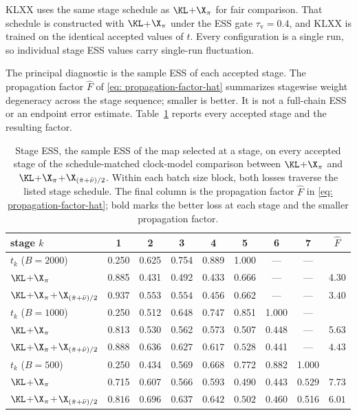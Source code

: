 \documentclass{article}
\begin{document}
KLXX uses the same stage schedule as $\KL$+$\X_\pi$ for fair comparison. That schedule is constructed with $\KL$+$\X_\pi$ under the ESS gate $\tau_{\mathrm v}=0.4$, and KLXX is trained on the identical accepted values of $t$. Every configuration is a single run, so individual stage ESS values carry single-run fluctuation.

The principal diagnostic is the sample ESS of each accepted stage. The propagation factor $\hat F$ of \eqref{eq: propagation-factor-hat} summarizes stagewise weight degeneracy across the stage sequence; smaller is better. It is not a full-chain ESS or an endpoint error estimate. Table~\ref{tab: clock-summary} reports every accepted stage and the resulting factor.

\begin{table}[htb]
    \centering
    \begin{tabular}{lcccccccc}
        \toprule
        stage $k$ & 1 & 2 & 3 & 4 & 5 & 6 & 7 & $\hat F$ \\
        \midrule
        $t_k$ ($B=2000$) & 0.250 & 0.625 & 0.754 & 0.889 & 1.000 & --- & --- & \\
        $\KL$+$\X_\pi$ & 0.885 & 0.431 & 0.492 & 0.433 & $\mathbf{0.666}$ & --- & --- & 4.30 \\
        $\KL$+$\X_\pi$+$\X_{(\hat\pi+\bar\nu)/2}$ & $\mathbf{0.937}$ & $\mathbf{0.553}$ & $\mathbf{0.554}$ & $\mathbf{0.456}$ & 0.662 & --- & --- & $\mathbf{3.40}$ \\
        \midrule
        $t_k$ ($B=1000$) & 0.250 & 0.512 & 0.648 & 0.747 & 0.851 & 1.000 & --- & \\
        $\KL$+$\X_\pi$ & 0.813 & 0.530 & 0.562 & 0.573 & 0.507 & $\mathbf{0.448}$ & --- & 5.63 \\
        $\KL$+$\X_\pi$+$\X_{(\hat\pi+\bar\nu)/2}$ & $\mathbf{0.888}$ & $\mathbf{0.636}$ & $\mathbf{0.627}$ & $\mathbf{0.617}$ & $\mathbf{0.528}$ & 0.441 & --- & $\mathbf{4.43}$ \\
        \midrule
        $t_k$ ($B=500$) & 0.250 & 0.434 & 0.569 & 0.668 & 0.772 & 0.882 & 1.000 & \\
        $\KL$+$\X_\pi$ & 0.715 & 0.607 & 0.566 & 0.593 & 0.490 & 0.443 & $\mathbf{0.529}$ & 7.73 \\
        $\KL$+$\X_\pi$+$\X_{(\hat\pi+\bar\nu)/2}$ & $\mathbf{0.816}$ & $\mathbf{0.696}$ & $\mathbf{0.637}$ & $\mathbf{0.642}$ & $\mathbf{0.502}$ & $\mathbf{0.460}$ & 0.516 & $\mathbf{6.01}$ \\
        \bottomrule
    \end{tabular}
    \caption{Stage ESS, the sample ESS of the map selected at a stage, on every accepted stage of the schedule-matched clock-model comparison between $\KL$+$\X_\pi$ and $\KL$+$\X_\pi$+$\X_{(\hat\pi+\bar\nu)/2}$. Within each batch size block, both losses traverse the listed stage schedule. The final column is the propagation factor $\hat F$ in \eqref{eq: propagation-factor-hat}; bold marks the better loss at each stage and the smaller propagation factor.}
    \label{tab: clock-summary}
\end{table}
\end{document}
